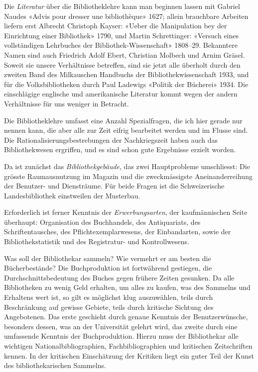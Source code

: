 \documentclass[a4paper,
fontsize=11pt,
oneside,
numbers=noperiodatend,
parskip=half-,
bibliography=totoc,
final
]{scrartcl}
\begin{document}
Die \emph{Literatur} über die Bibliotheklehre kann man beginnen lassen
mit Gabriel Naudes «Advis pour dresser une bibliothèque» 1627; allein
brauchbare Arbeiten liefern erst Albrecht Christoph Kayser: «Ueber die
Manipulation bey der Einrichtung einer Bibliothek» 1790, und Martin
Schrettinger: «Versuch eines vollständigen Lehrbuches der
Bibliothek-Wissenschaft» 1808--29. Bekanntere Namen sind auch Friedrich
Adolf Ebert, Christian Molbech und Arnim Gräsel. Soweit sie unsere
Verhältnisse betreffen, sind sie jetzt alle überholt durch den zweiten
Band des Milkauschen Handbuchs der Bibliothekwissenschaft 1933, und für
die Volksbibliotheken durch Paul Ladewigs «Politik der Bücherei» 1934.
Die einschlägige englische und amerikanische Literatur kommt wegen der
andern Verhältnisse für uns weniger in Betracht.

Die Bibliotheklehre umfasst eine Anzahl Spezialfragen, die ich hier
gerade nur nennen kann, die aber alle zur Zeit eifrig bearbeitet werden
und im Flusse sind. Die Rationalisierungsbestrebungen der Nachkriegszeit
haben auch das Bibliothekwesen ergriffen, und es sind schon gute
Ergebnisse erzielt worden.

Da ist zunächst das \emph{Bibliothekgebäude}, das zwei Hauptprobleme
umschliesst: Die grösste Raumausnutzung im Magazin und die
zweckmässigste Aneinanderreihung der Benutzer- und Diensträume. Für
beide Fragen ist die Schweizerische Landesbibliothek einstweilen der
Musterbau.

Erforderlich ist ferner Kenntnis der \emph{Erwerbungsarten}, der
kaufmännischen Seite überhaupt: Organisation des Buchhandels, des
Antiquariats, des Schriftentausches, des Pflichtexemplarwesens, der
Einbandarten, sowie der Bibliothekstatistik und des Registratur- und
Kontrollwesens.

Was soll der Bibliothekar sammeln? Wie vermehrt er am besten die
Bücherbestände? Die Buchproduktion ist fortwährend gestiegen, die
Durchschnittsbedeutung des Buches gegen frühere Zeiten gesunken. Da alle
Bibliotheken zu wenig Geld erhalten, um alles zu kaufen, was des
Sammelns und Erhaltens wert ist, so gilt es möglichst klug auszuwählen,
teils durch Beschränkung auf gewisse Gebiete, teils durch kritische
Sichtung des Angebotenen. Das erste geschieht durch genaue Kenntnis der
Benutzerwünsche, besonders dessen, was an der Universität gelehrt wird,
das zweite durch eine umfassende Kenntnis der Buchproduktion. Hierzu
muss der Bibliothekar alle wichtigen Nationalbibliographien,
Fachbibliographien und kritischen Zeitschriften kennen. In der
kritischen Einschätzung der Kritiken liegt ein guter Teil der Kunst des
bibliothekarischen Sammelns.
\end{document}
